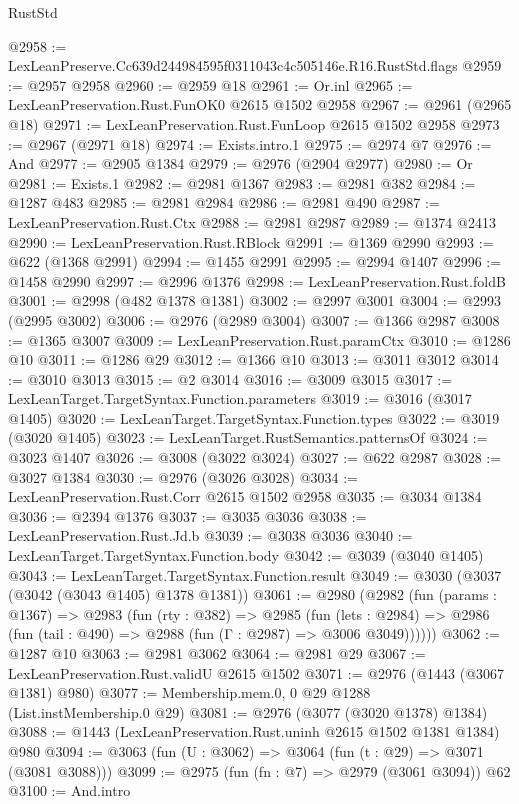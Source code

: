 \begin{lexlean}{RustStd}
\begin{coremodule}
@2958 := LexLeanPreserve.Cc639d244984595f0311043c4c505146e.R16.RustStd.flags
@2959 := @2957 @2958
@2960 := @2959 @18
@2961 := Or.inl
@2965 := LexLeanPreservation.Rust.FunOK0 @2615 @1502 @2958
@2967 := @2961 (@2965 @18)
@2971 := LexLeanPreservation.Rust.FunLoop @2615 @1502 @2958
@2973 := @2967 (@2971 @18)
@2974 := Exists.intro.{1}
@2975 := @2974 @7
@2976 := And
@2977 := @2905 @1384
@2979 := @2976 (@2904 @2977)
@2980 := Or
@2981 := Exists.{1}
@2982 := @2981 @1367
@2983 := @2981 @382
@2984 := @1287 @483
@2985 := @2981 @2984
@2986 := @2981 @490
@2987 := LexLeanPreservation.Rust.Ctx
@2988 := @2981 @2987
@2989 := @1374 @2413
@2990 := LexLeanPreservation.Rust.RBlock
@2991 := @1369 @2990
@2993 := @622 (@1368 @2991)
@2994 := @1455 @2991
@2995 := @2994 @1407
@2996 := @1458 @2990
@2997 := @2996 @1376
@2998 := LexLeanPreservation.Rust.foldB
@3001 := @2998 (@482 @1378 @1381)
@3002 := @2997 @3001
@3004 := @2993 (@2995 @3002)
@3006 := @2976 (@2989 @3004)
@3007 := @1366 @2987
@3008 := @1365 @3007
@3009 := LexLeanPreservation.Rust.paramCtx
@3010 := @1286 @10
@3011 := @1286 @29
@3012 := @1366 @10
@3013 := @3011 @3012
@3014 := @3010 @3013
@3015 := @2 @3014
@3016 := @3009 @3015
@3017 := LexLeanTarget.TargetSyntax.Function.parameters
@3019 := @3016 (@3017 @1405)
@3020 := LexLeanTarget.TargetSyntax.Function.types
@3022 := @3019 (@3020 @1405)
@3023 := LexLeanTarget.RustSemantics.patternsOf
@3024 := @3023 @1407
@3026 := @3008 (@3022 @3024)
@3027 := @622 @2987
@3028 := @3027 @1384
@3030 := @2976 (@3026 @3028)
@3034 := LexLeanPreservation.Rust.Corr @2615 @1502 @2958
@3035 := @3034 @1384
@3036 := @2394 @1376
@3037 := @3035 @3036
@3038 := LexLeanPreservation.Rust.Jd.b
@3039 := @3038 @3036
@3040 := LexLeanTarget.TargetSyntax.Function.body
@3042 := @3039 (@3040 @1405)
@3043 := LexLeanTarget.TargetSyntax.Function.result
@3049 := @3030 (@3037 (@3042 (@3043 @1405) @1378 @1381))
@3061 := @2980
    (@2982
      (fun (params : @1367) =>
      @2983
        (fun (rty : @382) =>
        @2985
          (fun (lets : @2984) =>
          @2986 (fun (tail : @490) => @2988 (fun (Γ : @2987) => @3006 @3049))))))
@3062 := @1287 @10
@3063 := @2981 @3062
@3064 := @2981 @29
@3067 := LexLeanPreservation.Rust.validU @2615 @1502
@3071 := @2976 (@1443 (@3067 @1381) @980)
@3077 := Membership.mem.{0, 0} @29 @1288 (List.instMembership.{0} @29)
@3081 := @2976 (@3077 (@3020 @1378) @1384)
@3088 := @1443 (LexLeanPreservation.Rust.uninh @2615 @1502 @1381 @1384) @980
@3094 := @3063 (fun (U : @3062) => @3064 (fun (t : @29) => @3071 (@3081 @3088)))
@3099 := @2975 (fun (fn : @7) => @2979 (@3061 @3094)) @62
@3100 := And.intro

\end{coremodule}
\end{lexlean}

